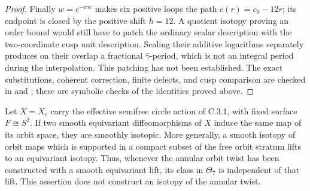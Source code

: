 \begin{proof}
Finally \(w=e^{-\pi i c}\) makes six positive loops the path
\(c(r)=c_0-12r\); its endpoint is closed by the positive shift
\(h=12\). A quotient isotopy proving an order bound would still
have to patch the ordinary scalar description with the two-coordinate
cusp unit description. Scaling their additive logarithms separately
produces on their overlap a fractional
\(\widehat\gamma\)-period, which is not an integral period during
the interpolation. This patching has not been established. The
exact substitutions, coherent correction, finite defects, and
cusp comparison are checked in
 and
; these are symbolic checks of the
identities proved above.
\end{proof}
\begin{proposition}
Let \(X=X_c\) carry the effective semifree circle action of C.3.1,
with fixed surface \(F\cong S^2\). If two smooth equivariant
diffeomorphisms of \(X\) induce the same map of its orbit space,
they are smoothly isotopic. More generally, a smooth isotopy of
orbit maps which is supported in a compact subset of the free
orbit stratum lifts to an equivariant isotopy. Thus, whenever the
annular orbit twist has been constructed with a smooth equivariant
lift, its class in \(\Theta_7\) is independent of that lift.
This assertion does not construct an isotopy of the annular twist.
\end{proposition}
